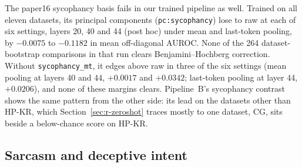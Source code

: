 The paper16 sycophancy basis fails in our trained pipeline as well. %
Trained on all eleven datasets, its principal components (\texttt{pc:sycophancy}) lose to raw at each of six settings, layers 20, 40 and 44 (post hoc) under mean and last-token pooling, by $-0.0075$ to $-0.1182$ in mean off-diagonal AUROC. %
None of the 264 dataset-bootstrap comparisons in that run clears Benjamini--Hochberg correction. %
Without \texttt{sycophancy\_mt}, it edges above raw in three of the six settings (mean pooling at layers 40 and 44, $+0.0017$ and $+0.0342$; last-token pooling at layer 44, $+0.0206$), and none of these margins clears. %
Pipeline~B's sycophancy contrast shows the same pattern from the other side: its lead on the datasets other than HP-KR, which Section~\ref{sec:r-zeroshot} traces mostly to one dataset, CG, sits beside a below-chance score on HP-KR. %

\subsection{Sarcasm and deceptive intent}
\label{sec:r-sarcasm}

